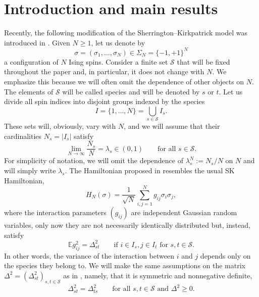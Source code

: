 \documentclass[aop,MSNbibl,dvips]{arximspdf}
\def\cal{\mathscr}
\newcommand{\spe}{{\cal S}}
\newcommand{\e}{\mathbb{E}}
\begin{document}
\section{Introduction and main results}
Recently, the following modification of the Sherrington--Kirkpatrick
model \cite{SK} was introduced in \cite{MS}. Given $N\geq1$, let us
denote by
%
\begin{equation}
\sigma= (\sigma_1,\ldots,\sigma_N) \in
\Sigma_N = \{-1,+1 \}^N
\end{equation}
%
a configuration of $N$ Ising spins. Consider a finite set $\spe$ that
will be fixed throughout the paper and, in particular, it does not
change with $N$. We emphasize this because we will often omit the
dependence of other objects on $N$. The elements of $\spe$ will be
called species and will be denoted by $s$ or $t$. Let us divide all
spin indices into disjoint groups indexed by the species
%
\begin{equation}
I = \{1,\ldots, N \} = \bigcup_{s\in\spe}
I_s. \label{species}
\end{equation}
%
These sets will, obviously, vary with $N$, and we will assume that
their cardinalities $N_s =|I_s|$ satisfy
%
\begin{equation}
\lim_{N\to\infty} \frac{N_s}{N} = \lambda_s \in(0,1)
\qquad\mbox{for all } s\in\spe.
\end{equation}
%
For simplicity of notation, we will omit the dependence of $\lambda_s^N
:= N_s/N$ on $N$ and will simply write $\lambda_s$. The Hamiltonian
proposed in \cite{MS} resembles the usual SK Hamiltonian,
%
\begin{equation}
H_N(\sigma) = \frac{1}{\sqrt{N}} \sum_{i,j =1}^N
g_{ij}\sigma_i \sigma_j, \label{SKH}
\end{equation}
%
where the interaction parameters $(g_{ij})$ are independent Gaussian
random variables, only now they are not necessarily identically
distributed but, instead, satisfy
%
\begin{equation}
\e g_{ij}^2 = \Delta_{st}^2 \qquad\mbox{if } i\in I_s, j\in I_t
\mbox{ for } s,t\in\spe.
\label{Delta}
\end{equation}
%
In other words, the variance of the interaction between $i$ and $j$
depends only on the species they belong to. We will make the same
assumptions on the matrix $\Delta^2 = (\Delta_{st}^2)_{s,t\in\spe}$ as
in \cite{MS}, namely, that it is symmetric and nonnegative definite,
%
\begin{equation}
\Delta_{st}^2 = \Delta_{ts}^2 \qquad\mbox{for all } s,t\in\spe\mbox{ and } \Delta^2 \geq0. \label{assumption}
\end{equation}
\end{document}
